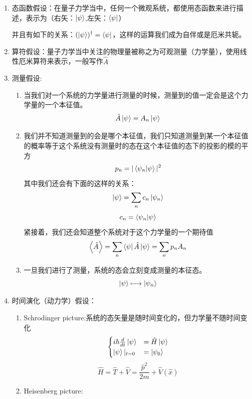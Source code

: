 \documentclass{article}
\begin{document}
\begin{enumerate}
	\item[(1)] 态函数假设：在量子力学当中，任何一个微观系统，都使用态函数来进行描述，表示为（右矢：$\ket{\psi}$,左矢：$\bra{\psi}$）

	      并且有如下的关系：$\displaystyle (\ket{\psi})^\dagger =\bra{\psi}$，这样的运算我们成为自伴或是厄米共轭。
	\item[(2)] 算符假设：量子力学当中关注的物理量被称之为可观测量（力学量），使用线性厄米算符来表示，一般写作$\hat{A}$
	\item[(3)] 测量假设:
	      \begin{enumerate}
		      \item 当我们对一个系统的力学量进行测量的时候，测量到的值一定会是这个力学量的一个本征值。
		            \[\hat{A}\ket{\psi}=A_n\ket{\psi}\]
		      \item 我们并不知道测量到的会是哪个本征值，我们只知道测量到某一个本征值的概率等于这个系统没有测量时的态在这个本征值的态下的投影的模的平方
		            \[p_n = |\innerproduct{\psi_n}{\psi}|^2\]
		            其中我们还会有下面的这样的关系：
		            \[\ket{\psi}=\sum_n c_n\ket{\psi_n}\]
		            \[c_n=\innerproduct{\psi_n}{\psi}\]
		            紧接着，我们还会知道整个系统对于这个力学量的一个期待值
		            \[\expectationvalue{\hat{A}} = \sum_n \bra{\psi}\hat{A}\ket{\psi}=\sum_np_nA_n\]
		      \item 一旦我们进行了测量，系统的态会立刻变成测量的本征态。
		            \[\ket{\psi}\longmapsto \ket{\psi_n}\]
	      \end{enumerate}
	\item[(4)] 时间演化（动力学）假设：
	      \begin{enumerate}
		      \item Schrodinger picture:系统的态矢量是随时间变化的，但力学量不随时间变化
		            \begin{equation*}
			            \begin{cases}
				            i\hbar\frac{d}{dt}\ket{\psi} & =\hat{H}\ket{\psi} \\
				            \ket{\psi}|_{t=0}            & =\ket{\psi_0}      \\
			            \end{cases}
		            \end{equation*}
		            \[\hat{H}=\hat{T}+\hat{V}=\frac{\hat{p}^2}{2m}+\hat{V}(\hat{x})\]
		      \item Heisenberg picture:
		            \begin{equation*}

\end{equation*}
\end{enumerate}
\end{enumerate}
\end{document}
